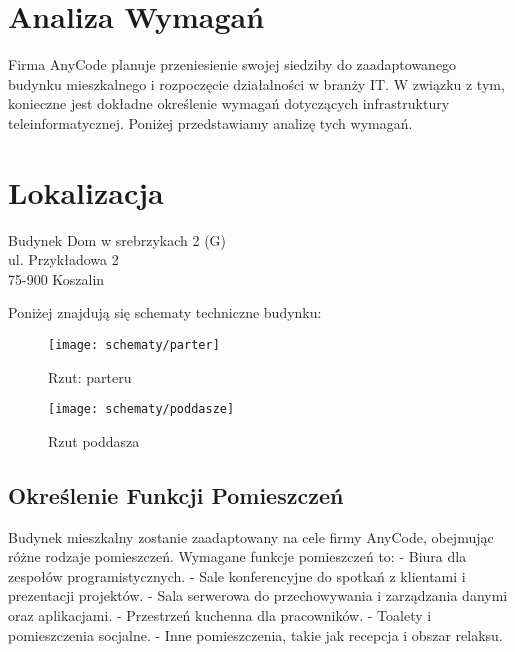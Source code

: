 \section{Analiza Wymagań}

Firma AnyCode planuje przeniesienie swojej siedziby do zaadaptowanego budynku mieszkalnego i rozpoczęcie działalności w branży IT. W związku z tym, konieczne jest dokładne określenie wymagań dotyczących infrastruktury teleinformatycznej. Poniżej przedstawiamy analizę tych wymagań.

\section{Lokalizacja}

    Budynek Dom w srebrzykach 2 (G) \\
    ul. Przykładowa 2\\
    75-900 Koszalin\\

    \begin{flushleft}
        Poniżej znajdują się schematy techniczne budynku: 

        \begin{figure}[!htb]
            \centering
            \begin{minipage}{0.8\textwidth}
                \centering
                \texttt{[image: schematy/parter]}
                \caption{Rzut: parteru}
            \end{minipage}
        \end{figure}

        \begin{figure}[!htb]
            \centering
            \begin{minipage}{0.8\textwidth}
                \centering
                \texttt{[image: schematy/poddasze]}
                \caption{Rzut poddasza}
            \end{minipage}
        \end{figure}

    \end{flushleft}


\subsection{Określenie Funkcji Pomieszczeń}

Budynek mieszkalny zostanie zaadaptowany na cele firmy AnyCode, obejmując różne rodzaje pomieszczeń. Wymagane funkcje pomieszczeń to:
- Biura dla zespołów programistycznych.
- Sale konferencyjne do spotkań z klientami i prezentacji projektów.
- Sala serwerowa do przechowywania i zarządzania danymi oraz aplikacjami.
- Przestrzeń kuchenna dla pracowników.
- Toalety i pomieszczenia socjalne.
- Inne pomieszczenia, takie jak recepcja i obszar relaksu.

